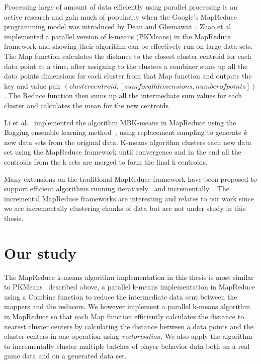 Processing large of amount of data efficiently using parallel processing is an active research and gain much of popularity when the Google's MapReduce programming model was introduced by Dean and Ghemawat~\citep{Dean:2004}. Zhao et al.~\citep{Zhao:2009} implemented a parallel version of k-means (PKMeans) in the MapReduce framework and showing their algorithm can be effectively run on large data sets. The Map function calculates the distance to the closest cluster centroid for each data point at a time, after assigning to the clusters a combiner sums up all the data points dimensions for each cluster from that Map function and outputs the key and value pair $(cluster centroid, [sum for all dimensions, number of points])$. The Reduce function then sums up all the intermediate sum values for each cluster and calculates the mean for the new centroids. 

Li et al.~\citep{Li:2011} implemented the algorithm MBK-means in MapReduce using the Bagging ensemble learning method~\citep{Breiman:1996}, using replacement sampling to generate  \textit{k} new data sets from the original data. K-means algorithm clusters each new data set using the MapReduce framework until convergence and in the end all the centroids from the k sets are merged to form the final k centroids.

Many extensions on the traditional MapReduce framework have been proposed to support efficient algorithms running iteratively~\citep{Condie:2010HadoopOnline, Ekanayake:2010Twister, Zaharia:2010Spark, Bu:2010HaLoop, Bu:2012HaLoop, Yan:2012IncMr} and incrementally~\citep{Bhatotia:2011Incoop, Yan:2012IncMr, Bhatotia:2012Slider}. The incremental MapReduce frameworks are interesting and relates to our work since we are incrementally clustering chunks of data but are not under study in this thesis.

\section{Our study}
The MapReduce k-means algorithm implementation in this thesis is most similar to PKMeans~\citep{Zhao:2009} described above, a parallel k-means implementation in MapReduce using a Combine function to reduce the intermediate data sent between the mappers and the reducers. We however implement a parallel k-means algorithm in MapReduce so that each Map function efficiently calculates the distance to nearest cluster centers by calculating the distance between a data points and the cluster centers in one operation using \textit{vectorisation}. We also apply the algorithm to incrementally cluster multiple batches of player behavior data both on a real game data and on a generated data set. 

